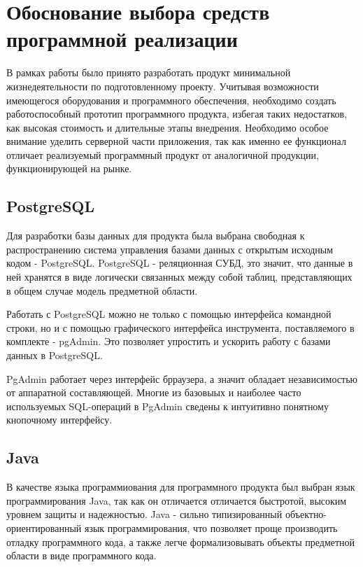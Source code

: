 \section{Обоснование выбора средств программной реализации}

В рамках работы было принято разработать продукт минимальной жизнедеятельности по подготовленному проекту. 
Учитывая возможности имеющегося оборудования и программного обеспечения, необходимо создать работоспособный прототип программного продукта, избегая таких недостатков, как высокая стоимость и длительные этапы внедрения.
Необходимо особое внимание уделить серверной части приложения, так как именно ее функционал отличает реализуемый программный продукт от аналогичной продукции, функционирующей на рынке.

\subsection{PostgreSQL}

Для разработки базы данных для продукта была выбрана свободная к распространению система управления базами данных с открытым исходным кодом - PostgreSQL.
PostgreSQL - реляционная СУБД, это значит, что данные в ней хранятся в виде логически связанных между собой таблиц, представляющих в общем случае модель предметной области.

Работать с PostgreSQL можно не только с помощью интерфейса командной строки, но и с помощью графического интерфейса инструмента, поставляемого в комплекте - pgAdmin. 
Это позволяет упростить и ускорить работу с базами данных в PostgreSQL.

PgAdmin работает через интерфейс брраузера, а значит обладает независимостью от аппаратной составляющей.
Многие из базовыых и наиболее часто используемых SQL-операций в PgAdmin сведены к интуитивно понятному кнопочному интерфейсу.

\subsection{Java}

В качестве языка программиования для программного продукта был выбран язык программирования Java, так как он отличается отличается быстротой, высоким уровнем защиты и надежностью.
Java - сильно типизированный объектно-ориентированный язык программирования, что позволяет проще производить отладку программного кода, а также легче формализовывать объекты предметной области в виде программного кода.

